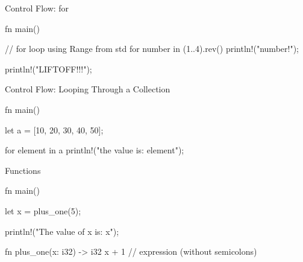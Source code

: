 \begin{frame}[fragile]{Control Flow: for}
    \begin{code}
        fn main() {
            // for loop using Range from std
            for number in (1..4).rev() {
                println!("{number}!");
            }

            println!("LIFTOFF!!!");
        }
    \end{code}
\end{frame}

\begin{frame}[fragile]{Control Flow: Looping Through a Collection}
    \begin{code}
        fn main() {
            let a = [10, 20, 30, 40, 50];

            for element in a {
                println!("the value is: {element}");
            }
        }
    \end{code}
\end{frame}

\begin{frame}[fragile]{Functions}
    \begin{code}
        fn main() {
            let x = plus_one(5);

            println!("The value of x is: {x}");
        }

        fn plus_one(x: i32) -> i32 {
            x + 1 // expression (without semicolons)
        }
    \end{code}
\end{frame}